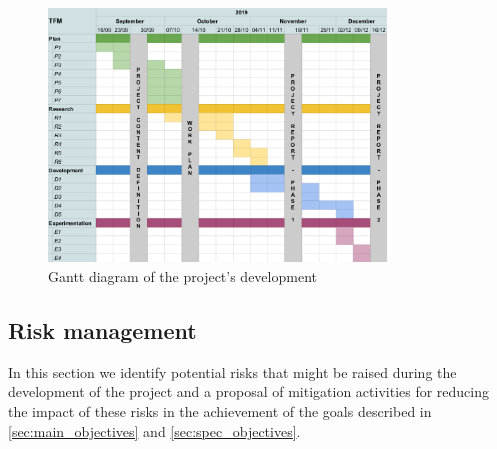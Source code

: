 \documentclass[11pt]{article}
\begin{document}
\begin{figure}[h]
  \centering
    \includegraphics[width=0.8\textwidth]{figures/gantt.png}
      \caption{Gantt diagram of the project's development}
\end{figure}

\subsection{Risk management}
\label{sec:risk}

In this section we identify potential risks that might be raised during the development of the project and a proposal of mitigation activities for reducing the impact of these risks in the achievement of the goals described in \ref{sec:main_objectives} and \ref{sec:spec_objectives}.
\end{document}
